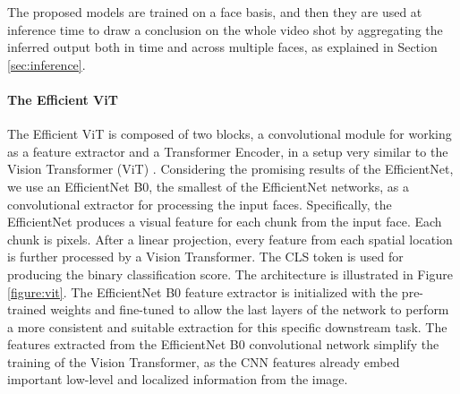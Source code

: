 \documentclass[runningheads]{llncs}
\begin{document}
The proposed models are trained on a face basis, and then they are used at inference time to draw a conclusion on the whole video shot by aggregating the inferred output both in time and across multiple faces, as explained in Section \ref{sec:inference}.

\paragraph{The Efficient ViT}
The Efficient ViT is composed of two blocks, a convolutional module for working as a feature extractor and a Transformer Encoder, in a setup very similar to the Vision Transformer (ViT) \cite{dosovitskiy2020image}.
Considering the promising results of the EfficientNet, we use an EfficientNet B0, the smallest of the EfficientNet networks, as a convolutional extractor for processing the input faces. Specifically, the EfficientNet produces a visual feature for each chunk from the input face. Each chunk is  pixels. After a linear projection, every feature from each spatial location is further processed by a Vision Transformer. The CLS token is used for producing the binary classification score. The architecture is illustrated in Figure \ref{figure:vit}. The EfficientNet B0 feature extractor is initialized with the pre-trained weights and fine-tuned to allow the last layers of the network to perform a more consistent and suitable extraction for this specific downstream task. The features extracted from the EfficientNet B0 convolutional network simplify the training of the Vision Transformer, as the CNN features already embed important low-level and localized information from the image. 
\end{document}
